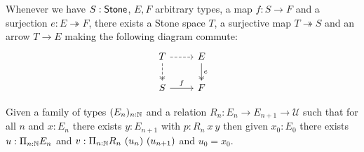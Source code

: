 \begin{axiomNum}
  Whenever we have $S:\mathsf{Stone}$, $E,F$ arbitrary types, a map $f:S \to F$ and a 
  surjection $e:E \twoheadrightarrow F$, 
  there exists a Stone space $T$, a surjective map 
  $T\twoheadrightarrow S$ and an arrow $T\to E$ making the following diagram commute:
    \begin{equation}\begin{tikzcd}
      T \arrow[d,dashed, two heads ] \arrow[r,dashed]&  E \arrow[d,""',two heads, "e"]\\
      S  \arrow[r, "f"] & F
    \end{tikzcd}\end{equation}  
\end{axiomNum}


\begin{axiomNum}\label{axDependentChoice}
  Given a family of types $(E_n)_{n:\mathbb{N}}$ and 
  a relation 
  $R_n:E_n\rightarrow E_{n+1}\rightarrow {\mathcal U}$ such that
  for all $n$ and $x:E_n$ there exists $y:E_{n+1}$ with $p:R_n~x~y$ 
  then given $x_0:E_0$ there exists
  $u:\Pi_{n:\mathbb{N}}E_n$ and $v:\Pi_{n:\mathbb{N}}R_n~(u_n)~(u_{n+1})$ and $u_0 = x_0$.
\end{axiomNum}
